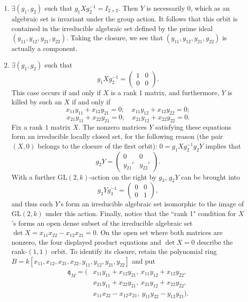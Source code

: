 \begin{example}
\begin{enumerate}
\item $\exists (g_1, g_2)$ such that $g_1Xg_2^{-1} = I_{2\times 2}$.
Then $Y$ is necessarily $0$, which as an algebraic set is
invariant under the group action. It follows that this orbit is
contained in the irreducible algebraic set defined by the prime
ideal $(y_{11}, y_{12}, y_{21}, y_{22})$. Taking the closure, we see
that $(y_{11}, y_{12}, y_{21}, y_{22})$ is actually a component.
\item $\exists (g_1, g_2)$ such that
$$
g_1Xg_2^{-1} = \left(
\begin{matrix}
1 & 0 \\
0 & 0
\end{matrix}
\right).
$$
This case occurs if and only if $X$ is a rank 1 matrix,
and furthermore, $Y$ is killed by such an $X$ if and only if
$$
x_{11}y_{11}+x_{12}y_{21} = 0; \quad x_{11}y_{12}+x_{12}y_{22} = 0;
$$
$$
x_{21}y_{11}+x_{22}y_{21} = 0; \quad x_{21}y_{12}+x_{22}y_{22} = 0.
$$
Fix a rank $1$ matrix $X$. The nonzero matrices $Y$ satisfying these
equations form an irreducible locally closed set, for the following
reason (the pair $(X,0)$ belongs to the closure of the first orbit):
$0 = g_1Xg_2^{-1}g_2Y$ implies that
$$
g_2Y = \left(
\begin{matrix}
0 & 0 \\
y_{21}' & y_{22}'
\end{matrix}
\right).
$$
With a further $\text{GL}(2, k)$-action on the right by $g_3$,
$g_2Y$ can be brought into
$$
g_2Yg_3^{-1} = \left(
\begin{matrix}
0 & 0 \\
0 & 1
\end{matrix}
\right),
$$
and thus such $Y$'s form an irreducible algebraic set
isomorphic to the image of $\text{GL}(2, k)$ under this action. Finally,
notice that the ``rank 1" condition for $X$'s forms an open dense
subset of the irreducible algebraic set
$\det X = x_{11}x_{22} - x_{12}x_{21} = 0$.
On the open set where both matrices are nonzero, the four displayed
product equations and $\det X=0$ describe the rank-$(1,1)$ orbit.
To identify its closure, retain the polynomial ring
$B=k[x_{11},x_{12},x_{21},x_{22},y_{11},y_{12},y_{21},y_{22}]$
and put
$$
\begin{aligned}
\mathfrak q_M=(
&x_{11}y_{11}+x_{12}y_{21},\ x_{11}y_{12}+x_{12}y_{22},\\
&x_{21}y_{11}+x_{22}y_{21},\ x_{21}y_{12}+x_{22}y_{22},\\
&x_{11}x_{22}-x_{12}x_{21},\ y_{11}y_{22}-y_{12}y_{21}).

\end{aligned}$$
\end{enumerate}
\end{example}

